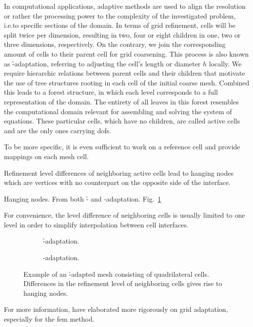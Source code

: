 In computational applications, adaptive methods are used to align the resolution or rather the processing power to the complexity of the investigated problem, i.e.\@ to specific sections of the domain. In terms of grid refinement, cells will be split twice per dimension, resulting in two, four or eight children in one, two or three dimensions, respectively. On the contrary, we join the corresponding amount of cells to their parent cell for grid coarsening. This process is also known as \h-adaptation, referring to adjusting the cell's length or diameter \(h\) locally. We require hierarchic relations between parent cells and their children that motivate the use of tree structures rooting in each cell of the initial coarse mesh. Combined this leads to a forest structure, in which each level corresponds to a full representation of the domain. The entirety of all leaves in this forest resembles the computational domain relevant for assembling and solving the system of equations. These particular cells, which have no children, are called active cells and are the only ones carrying \glspl{dof}.

To be more specific, it is even sufficient to work on a reference cell and provide mappings on each mesh cell.

Refinement level differences of neighboring active cells lead to hanging nodes which are vertices with no counterpart on the opposite side of the interface.

Hanging nodes. From both \h- and \p-adaptation.
Fig.~\ref{fig:hpadaptivity}

For convenience, the level difference of neighboring cells is usually limited to one level in order to simplify interpolation between cell interfaces.

\begin{figure}
\begin{subfigure}{0.5\textwidth}
  \centering
  
  \caption{\h-adaptation.}
\end{subfigure}
\begin{subfigure}{0.5\textwidth}
  \centering
  
  \caption{\p-adaptation.}
\end{subfigure}
\caption{Example of an \h-adapted mesh consisting of quadrilateral cells. Differences in the refinement level of neighboring cells gives rise to hanging nodes.}
\label{fig:hpadaptivity}
\end{figure}

For more information, \textcite{bangerth2003} have elaborated more rigorously on grid adaptation, especially for the \gls{fem} method.

